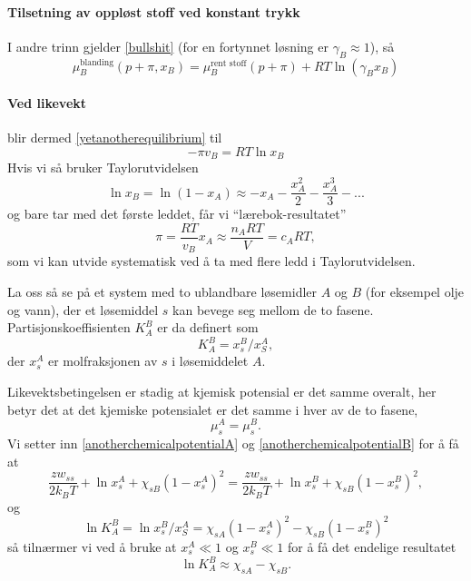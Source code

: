 \paragraph{Tilsetning av oppløst stoff ved konstant trykk} I andre trinn gjelder \eqref{bullshit} (for en fortynnet løsning er $\gamma_B\approx 1$), så
\begin{equation}
	\mu_B^{\text{blanding}}(p+\pi,x_B) = \mu_B^{\text{rent stoff}}(p+\pi) + RT\ln(\gamma_B x_B)
\end{equation}

\paragraph{Ved likevekt} blir dermed \eqref{yetanotherequilibrium} til
\begin{equation}
	-\pi v_B = RT\ln x_B
\end{equation}
Hvis vi så bruker Taylorutvidelsen
\begin{equation}
	\ln x_B = \ln (1-x_A) \approx -x_A - \frac{x_A^2}{2} - \frac{x_A^3}{3} - ...
\end{equation}
og bare tar med det første leddet, får vi ``lærebok-resultatet''
\begin{equation}
	\pi = \frac{RT}{v_B}x_A\approx\frac{n_ART}{V}=c_ART,
\end{equation}
som vi kan utvide systematisk ved å ta med flere ledd i Taylorutvidelsen.

La oss så se på et system med to ublandbare løsemidler $A$ og $B$ (for eksempel olje og vann), der et løsemiddel $s$ kan bevege seg mellom de to fasene. Partisjonskoeffisienten $K_A^B$ er da definert som 
\begin{equation}
	\label{partitioncoefficient}
	K_A^B=x_s^B/x_S^A,
\end{equation}
der $x_s^A$ er molfraksjonen av $s$ i løsemiddelet $A$. 

Likevektsbetingelsen er stadig at kjemisk potensial er det samme overalt, her betyr det at det kjemiske potensialet er det samme i hver av de to fasene,
\begin{equation}
	\mu_s^A=\mu_s^B.
\end{equation}
Vi setter inn \eqref{anotherchemicalpotentialA} og \eqref{anotherchemicalpotentialB} for å få at
\begin{equation}
	\frac{zw_{ss}}{2k_BT}+\ln x_s^A+\chi_{sB}(1-x_s^A)^2 = \frac{zw_{ss}}{2k_BT}+\ln x_s^B+\chi_{sB}(1-x_s^B)^2, 
\end{equation}
og
\begin{equation}
	\ln K_A^B = \ln x_s^B/x_S^A = \chi_{sA}(1-x_s^A)^2-\chi_{sB}(1-x_s^B)^2
\end{equation}
så tilnærmer vi ved å bruke at $x_s^A \ll 1$ og $x_s^B \ll 1$ for å få det endelige resultatet
\begin{equation}
	\ln K_A^B \approx \chi_{sA}-\chi_{sB}.
\end{equation}

